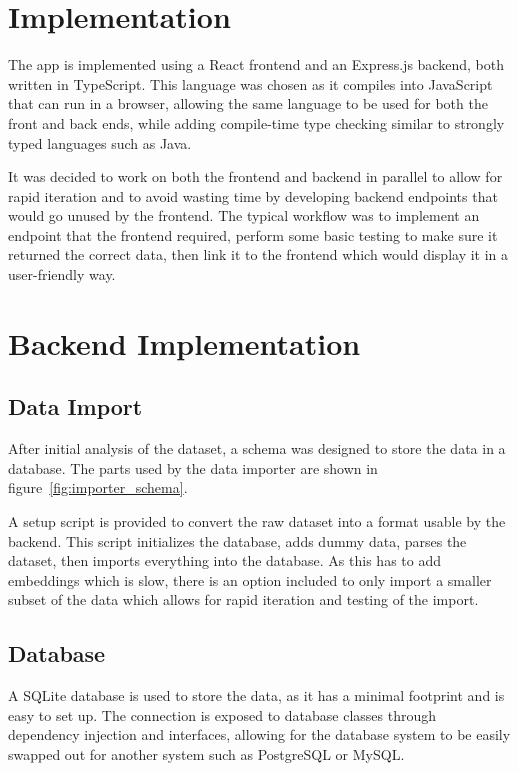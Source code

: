 \section{Implementation}

The \chef{} app is implemented using a React frontend and an Express.js backend, both written in TypeScript.
This language was chosen as it compiles into JavaScript that can run in a browser, allowing the same language to be used for both
the front and back ends, while adding compile-time type checking similar to strongly typed languages such as Java.

It was decided to work on both the frontend and backend in parallel to allow for rapid iteration and to avoid wasting time by
developing backend endpoints that would go unused by the frontend. The typical workflow was to implement an endpoint that
the frontend required, perform some basic testing to make sure it returned the correct data, then link it to the frontend which
would display it in a user-friendly way.

\section{Backend Implementation}

\subsection{Data Import}

After initial analysis of the dataset, a schema was designed to store the data in a database. The parts used by the
data importer are shown in figure~\ref{fig:importer_schema}.

A setup script is provided to convert the raw dataset into a format usable by the backend.
This script initializes the database, adds dummy data, parses the dataset, then imports everything
into the database. As this has to add embeddings which is slow, there is an option included
to only import a smaller subset of the data which allows for rapid iteration and testing of the import.

\subsection{Database}

A SQLite database is used to store the data, as it has a minimal footprint and is easy to set up. The connection
is exposed to database classes through dependency injection and interfaces, allowing for the database system to be
easily swapped out for another system such as PostgreSQL or MySQL.

